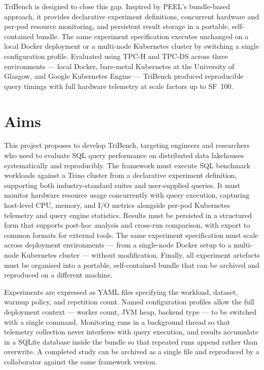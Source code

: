 \documentclass{l4proj}
\begin{document}
TriBench is designed to close this gap. Inspired by PEEL's bundle-based approach, it provides declarative experiment definitions, concurrent hardware and per-pod resource monitoring, and persistent result storage in a portable, self-contained bundle. The same experiment specification executes unchanged on a local Docker deployment or a multi-node Kubernetes cluster by switching a single configuration profile. Evaluated using TPC-H and TPC-DS across three environments --- local Docker, bare-metal Kubernetes at the University of Glasgow, and Google Kubernetes Engine --- TriBench produced reproducible query timings with full hardware telemetry at scale factors up to SF~100.

\section{Aims}
\label{sec:aims}

This project proposes to develop TriBench, targeting engineers and researchers who need to evaluate SQL query performance on distributed data lakehouses systematically and reproducibly. The framework must execute SQL benchmark workloads against a Trino cluster from a declarative experiment definition, supporting both industry-standard suites and user-supplied queries. It must monitor hardware resource usage concurrently with query execution, capturing host-level CPU, memory, and I/O metrics alongside per-pod Kubernetes telemetry and query engine statistics. Results must be persisted in a structured form that supports post-hoc analysis and cross-run comparison, with export to common formats for external tools. The same experiment specification must scale across deployment environments --- from a single-node Docker setup to a multi-node Kubernetes cluster --- without modification. Finally, all experiment artefacts must be organised into a portable, self-contained bundle that can be archived and reproduced on a different machine.

Experiments are expressed as YAML files specifying the workload, dataset, warmup policy, and repetition count. Named configuration profiles allow the full deployment context --- worker count, JVM heap, backend type --- to be switched with a single command. Monitoring runs in a background thread so that telemetry collection never interferes with query execution, and results accumulate in a SQLite database inside the bundle so that repeated runs append rather than overwrite. A completed study can be archived as a single file and reproduced by a collaborator against the same framework version.
\end{document}

